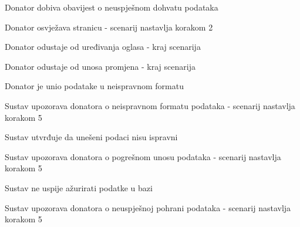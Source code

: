 \begin{packed_item}
\begin{packed_item}
\begin{packed_enum}
								\item Donator dobiva obavijest o neuspješnom dohvatu podataka
								\item
									\begin{packed_enum}
										\item Donator osvježava stranicu - scenarij nastavlja korakom 2
										\item Donator odustaje od uređivanja oglasa - kraj scenarija
									\end{packed_enum}
							\end{packed_enum}
							\item[5.a] Donator odustaje od unosa promjena - kraj scenarija
							\item[6.a] Donator je unio podatake u neispravnom formatu
							\item[] \begin{packed_enum}
								\item Sustav upozorava donatora o neispravnom formatu podataka - scenarij nastavlja korakom 5
							\end{packed_enum}	
							\item[8.a] Sustav utvrđuje da unešeni podaci nisu ispravni
							\item[] \begin{packed_enum}
								\item Sustav upozorava donatora o pogrešnom unosu podataka - scenarij nastavlja korakom 5
							\end{packed_enum}
							\item[8.b] Sustav ne uspije ažurirati podatke u bazi
							\item[] \begin{packed_enum}
								\item Sustav upozorava donatora o neuspješnoj pohrani podataka - scenarij nastavlja korakom 5 
							\end{packed_enum}					
						\end{packed_item}
					\end{packed_item}

